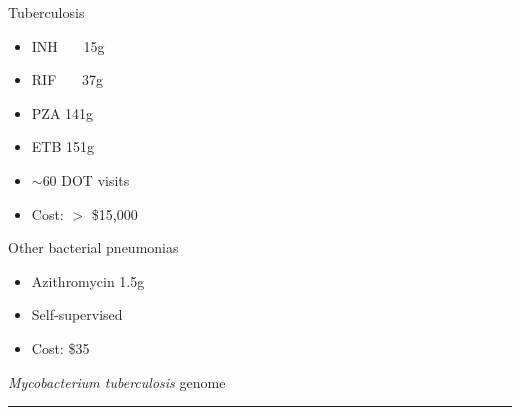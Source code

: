 \documentclass[12pt]{article}
\newcommand{\headsize}{\fontsize{35}{35} \selectfont}
\newcommand{\textsize}{\fontsize{30}{35} \selectfont}
\newcommand{\headcolor}{\color [cmyk]{0.72,0.67,0.33,0}}
\newcommand{\linecolor}{\color [named]{Thistle}}
\newcommand{\pointcolor}{\color [named]{Bittersweet}}
\begin{document}
\begin{minipage}[t]{4in} 
{\headcolor \textsize Tuberculosis}

\vspace{5mm}

\begin{itemize}
\item INH ~~~15g
\item RIF ~~~37g
\item PZA 141g
\item ETB 151g

\vspace{10mm}

\item $\sim$60 DOT visits

\vspace{10mm}

\item Cost: {\pointcolor $>$ \$15,000}
\end{itemize} \end{minipage}
\hfill
\begin{minipage}[t]{5.5in} 
{\headcolor \textsize Other bacterial pneumonias}

\vspace{5mm}

\begin{itemize}
\item Azithromycin 1.5g

\vspace{52mm}

\item Self-supervised

\vspace{10mm}

\item Cost: {\pointcolor \$35}
\end{itemize} \end{minipage}


\newpage

\headsize \headcolor
\centerline{\emph{Mycobacterium tuberculosis\/} genome}
\linecolor \noindent \rule[3mm]{10in}{2mm}

\vspace{5mm}
\textsize \normalcolor
\end{document}
